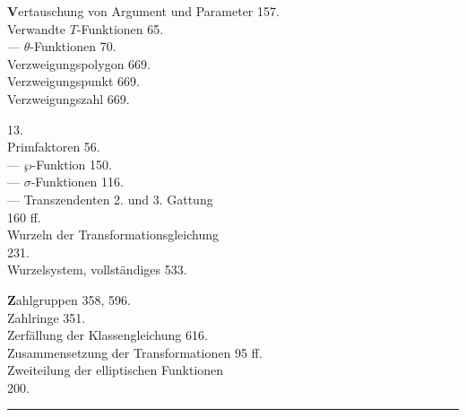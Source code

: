 \begin{minipage}[t]{0.48\textwidth}
\noindent \textbf{V}ertauschung von Argument und Parameter 157.\\
Verwandte $T$-Funktionen 65.\\
--- $\theta$-Funktionen 70.\\
Verzweigungspolygon 669.\\
Verzweigungspunkt 669.\\
Verzweigungszahl 669.

\noindent {} 13.\\
 Primfaktoren 56.\\
--- $\wp$-Funktion 150.\\
--- $\sigma$-Funktionen 116.\\
--- Transzendenten 2. und 3. Gattung\\
160 ff.\\
Wurzeln der Transformationsgleichung\\
231.\\
Wurzelsystem, vollständiges 533.

\noindent \textbf{Z}ahlgruppen 358, 596.\\
Zahlringe 351.\\
Zerfällung der Klassengleichung 616.\\
Zusammensetzung der Transformationen 95 ff.\\
Zweiteilung der elliptischen Funktionen\\
200.
\end{minipage}

\begin{center}
\rule{3cm}{0.4pt}
\end{center}
